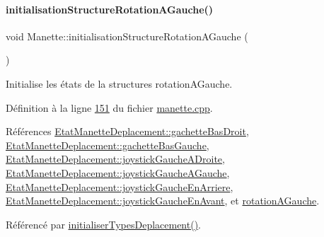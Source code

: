 \paragraph{\texorpdfstring{initialisation\+Structure\+Rotation\+A\+Gauche()}{initialisationStructureRotationAGauche()}}
{\footnotesize\ttfamily void Manette\+::initialisation\+Structure\+Rotation\+A\+Gauche (\begin{DoxyParamCaption}{ }\end{DoxyParamCaption})\hspace{0.3cm}{\ttfamily [private]}}



Initialise les états de la structures rotation\+A\+Gauche. 



Définition à la ligne \hyperlink{manette_8cpp_source_l00151}{151} du fichier \hyperlink{manette_8cpp_source}{manette.\+cpp}.



Références \hyperlink{manette_8h_source_l00185}{Etat\+Manette\+Deplacement\+::gachette\+Bas\+Droit}, \hyperlink{manette_8h_source_l00184}{Etat\+Manette\+Deplacement\+::gachette\+Bas\+Gauche}, \hyperlink{manette_8h_source_l00183}{Etat\+Manette\+Deplacement\+::joystick\+Gauche\+A\+Droite}, \hyperlink{manette_8h_source_l00182}{Etat\+Manette\+Deplacement\+::joystick\+Gauche\+A\+Gauche}, \hyperlink{manette_8h_source_l00181}{Etat\+Manette\+Deplacement\+::joystick\+Gauche\+En\+Arriere}, \hyperlink{manette_8h_source_l00180}{Etat\+Manette\+Deplacement\+::joystick\+Gauche\+En\+Avant}, et \hyperlink{manette_8h_source_l00227}{rotation\+A\+Gauche}.



Référencé par \hyperlink{manette_8cpp_source_l00085}{initialiser\+Types\+Deplacement()}.


